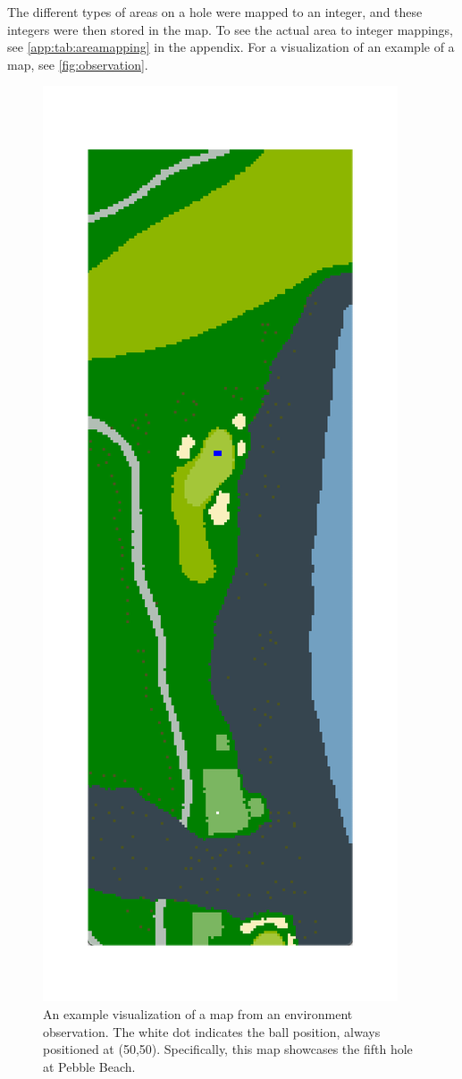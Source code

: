 \documentclass{kththesis}
\begin{document}
The different types of areas on a hole were mapped to an integer, and these integers were then stored in the map. To see the actual area to integer mappings, see \autoref{app:tab:areamapping} in the appendix. For a visualization of an example of a map, see \autoref{fig:observation}.

\begin{figure}
    \centering
    \includegraphics[height=0.5\textheight]{golf_observation_visualization.png}
    \caption{An example visualization of a map from an environment observation. The white dot indicates the ball position, always positioned at (50,50). Specifically, this map showcases the fifth hole at Pebble Beach.}
    \label{fig:observation}
\end{figure}
\end{document}
